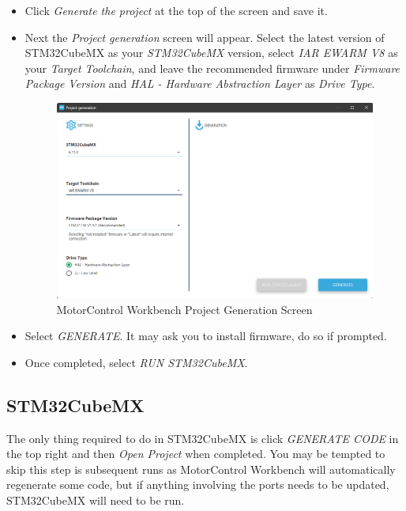 \documentclass[10pt]{article}
\begin{document}
\begin{itemize}
                \item Click \emph{Generate the project} at the top of the screen and save it.
                \item Next the \emph{Project generation} screen will appear. Select the latest version of STM32CubeMX as your \emph{STM32CubeMX} version, select \emph{IAR EWARM V8} as your \emph{Target Toolchain}, and leave the recommended firmware under \emph{Firmware Package Version} and \emph{HAL - Hardware Abstraction Layer} as \emph{Drive Type}.
                    \begin{figure}[H]
                        \centerline{\includegraphics[width=\textwidth]{References/MCW Project Gen.png}}
                        \caption{MotorControl Workbench Project Generation Screen}
                    \end{figure}
                \item Select \emph{GENERATE}. It may ask you to install firmware, do so if prompted.
                \item Once completed, select \emph{RUN STM32CubeMX}.
            \end{itemize}
		\FloatBarrier \subsection{STM32CubeMX}
            The only thing required to do in STM32CubeMX is click \emph{GENERATE CODE} in the top right and then \emph{Open Project} when completed. You may be tempted to skip this step is subsequent runs as MotorControl Workbench will automatically regenerate some code, but if anything involving the ports needs to be updated, STM32CubeMX will need to be run.
\end{document}
